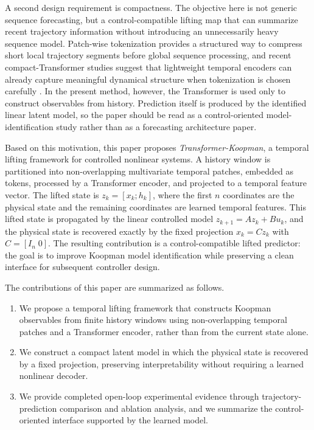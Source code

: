 \documentclass[journal]{IEEEtran}
\begin{document}
A second design requirement is compactness. The objective here is not generic sequence forecasting, but a control-compatible lifting map that can summarize recent trajectory information without introducing an unnecessarily heavy sequence model. Patch-wise tokenization provides a structured way to compress short local trajectory segments before global sequence processing, and recent compact-Transformer studies suggest that lightweight temporal encoders can already capture meaningful dynamical structure when tokenization is chosen carefully \cite{vaswani2017attention, nie2023time, zhou2022fedformer, liu2024itransformer, forootani2026compact, forootani2025synthetic}. In the present method, however, the Transformer is used only to construct observables from history. Prediction itself is produced by the identified linear latent model, so the paper should be read as a control-oriented model-identification study rather than as a forecasting architecture paper.

Based on this motivation, this paper proposes \emph{Transformer-Koopman}, a temporal lifting framework for controlled nonlinear systems. A history window is partitioned into non-overlapping multivariate temporal patches, embedded as tokens, processed by a Transformer encoder, and projected to a temporal feature vector. The lifted state is $z_k=[x_k;h_k]$, where the first $n$ coordinates are the physical state and the remaining coordinates are learned temporal features. This lifted state is propagated by the linear controlled model $z_{k+1}=Az_k+Bu_k$, and the physical state is recovered exactly by the fixed projection $x_k=Cz_k$ with $C=[I_n\;0]$. The resulting contribution is a control-compatible lifted predictor: the goal is to improve Koopman model identification while preserving a clean interface for subsequent controller design.

The contributions of this paper are summarized as follows.
\begin{enumerate}
    \item We propose a temporal lifting framework that constructs Koopman observables from finite history windows using non-overlapping temporal patches and a Transformer encoder, rather than from the current state alone.
    \item We construct a compact latent model in which the physical state is recovered by a fixed projection, preserving interpretability without requiring a learned nonlinear decoder.
    \item We provide completed open-loop experimental evidence through trajectory-prediction comparison and ablation analysis, and we summarize the control-oriented interface supported by the learned model.
\end{enumerate}
\end{document}
